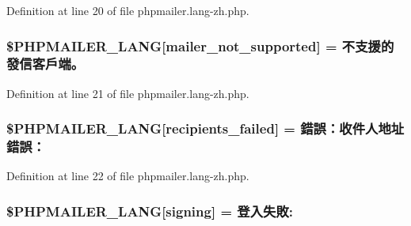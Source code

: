 Definition at line 20 of file phpmailer.\+lang-\/zh.\+php.

\subsubsection[{\texorpdfstring{\$\+P\+H\+P\+M\+A\+I\+L\+E\+R\+\_\+\+L\+A\+NG}{$PHPMAILER_LANG}}]{\setlength{\rightskip}{0pt plus 5cm}\$P\+H\+P\+M\+A\+I\+L\+E\+R\+\_\+\+L\+A\+NG\mbox{[}\textquotesingle{}mailer\+\_\+not\+\_\+supported\textquotesingle{}\mbox{]} = \textquotesingle{}不支援的發信客戶端。\textquotesingle{}}\hypertarget{phpmailer_8lang-zh_8php_aa2ebcb8833ee83a7ad67401c4bb3a6ad}{}\label{phpmailer_8lang-zh_8php_aa2ebcb8833ee83a7ad67401c4bb3a6ad}


Definition at line 21 of file phpmailer.\+lang-\/zh.\+php.

\subsubsection[{\texorpdfstring{\$\+P\+H\+P\+M\+A\+I\+L\+E\+R\+\_\+\+L\+A\+NG}{$PHPMAILER_LANG}}]{\setlength{\rightskip}{0pt plus 5cm}\$P\+H\+P\+M\+A\+I\+L\+E\+R\+\_\+\+L\+A\+NG\mbox{[}\textquotesingle{}recipients\+\_\+failed\textquotesingle{}\mbox{]} =  錯誤：收件人地址錯誤：\textquotesingle{}}\hypertarget{phpmailer_8lang-zh_8php_a7589d30bb9b368327c2df015f3e6bcba}{}\label{phpmailer_8lang-zh_8php_a7589d30bb9b368327c2df015f3e6bcba}


Definition at line 22 of file phpmailer.\+lang-\/zh.\+php.

\subsubsection[{\texorpdfstring{\$\+P\+H\+P\+M\+A\+I\+L\+E\+R\+\_\+\+L\+A\+NG}{$PHPMAILER_LANG}}]{\setlength{\rightskip}{0pt plus 5cm}\$P\+H\+P\+M\+A\+I\+L\+E\+R\+\_\+\+L\+A\+NG\mbox{[}\textquotesingle{}signing\textquotesingle{}\mbox{]} = \textquotesingle{}登入失敗\+: \textquotesingle{}}\hypertarget{phpmailer_8lang-zh_8php_a68e437bdb9b968a5a67320f03d231565}{}\label{phpmailer_8lang-zh_8php_a68e437bdb9b968a5a67320f03d231565}


